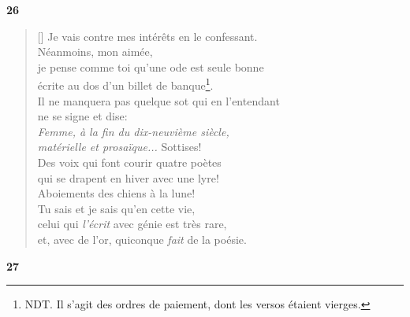 \documentclass[a4paper,12pt]{book}
\begin{document}
\bigskip

\begin{center}
  \textbf{26}
\end{center}

\settowidth{\versewidth}{je pense comme toi qu'une ode est seule bonne}

\begin{verse}[\versewidth]
  Je vais contre mes intérêts en le confessant. \\
  Néanmoins, mon aimée, \\
  je pense comme toi qu'une ode est seule bonne \\
  écrite au dos d'un billet de banque\footnote{NDT. Il s'agit des ordres de paiement, dont les versos étaient vierges.}. \\
  Il ne manquera pas quelque sot qui en l'entendant \\
  ne se signe et dise: \\
  \emph{Femme, à la fin du dix-neuvième siècle, \\
    matérielle et prosaïque...} Sottises! \\
  Des voix qui font courir quatre poètes \\
  qui se drapent en hiver avec une lyre! \\
  Aboiements des chiens à la lune! \\
  Tu sais et je sais qu'en cette vie, \\
  celui qui \emph{l'écrit} avec génie est très rare, \\
  et, avec de l'or, quiconque \emph{fait} de la poésie.
\end{verse}

\bigskip

\begin{center}
  \textbf{27}
\end{center}

\settowidth{\versewidth}{Éveillée, tu regardes et, en regardant, tes yeux}
\end{document}
